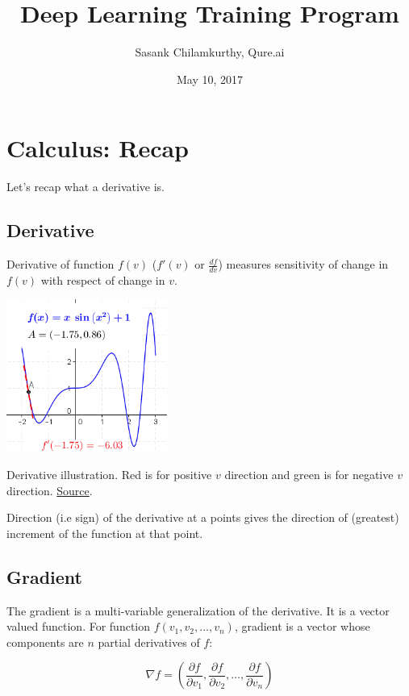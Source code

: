 \documentclass[a4paper]{tufte-handout}
\title{Deep Learning Training Program}
\author{Sasank Chilamkurthy, Qure.ai}
\date{May 10, 2017}
\begin{document}
\maketitle
\tableofcontents

\section{Calculus: Recap}\label{calculus-recap}

Let's recap what a derivative is.

\subsection{Derivative}\label{derivative}

Derivative of function \(f(v)\) (\(f'(v)\) or \(\frac{df}{dv}\))
measures sensitivity of change in \(f(v)\) with respect of change in
\(v\).

\begin{marginfigure}
  \includegraphics[height=50mm]{differential.png}
  \caption{Derivative illustration. Red is for positive \(v\)
direction and green is for negative \(v\) direction.
\href{https://en.wikipedia.org/wiki/Derivative}{Source}.}
\end{marginfigure}

Direction (i.e sign) of the derivative at a points gives the direction
of (greatest) increment of the function at that point.

\subsection{Gradient}\label{gradient}

The gradient is a multi-variable generalization of the derivative. It is
a vector valued function. For function \(f(v_1, v_2, \ldots, v_n)\),
gradient is a vector whose components are \(n\) partial derivatives of
\(f\):

\[ \nabla f = (\frac{\partial f}{\partial v_1 }, \frac{\partial f}{\partial v_2 }, \ldots, \frac{\partial f}{\partial v_n })\]
\end{document}
